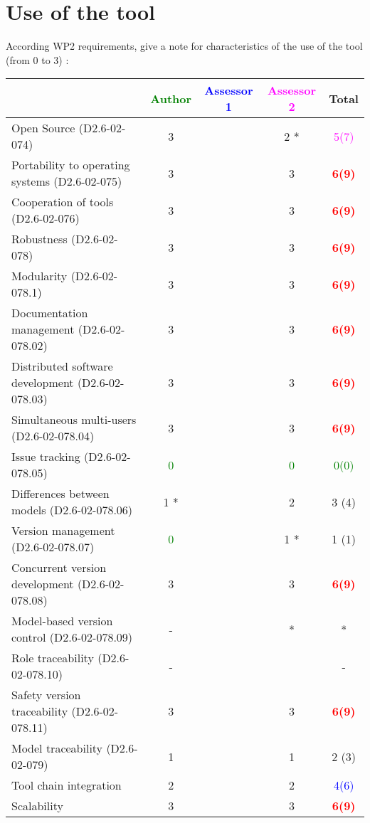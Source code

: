 \section{Use of the tool}


According WP2 requirements, give a note for characteristics of the use of the tool (from 0 to 3) :

\begin{tabular}{|l | c | c | c | c|}
\hline
& \textcolor{green}{Author} & \textcolor{blue}{Assessor 1} & \textcolor{magenta}{Assessor 2} & Total \\
\hline 
Open Source (D2.6-02-074) & 3     & & 2    *& \textcolor{magenta}{5(7)}  \\
\hline 
Portability to operating systems (D2.6-02-075) & 3     & & 3     &  \textcolor{red}{\textbf{6(9)}} \\
\hline
Cooperation of tools (D2.6-02-076) & 3     & & 3     &  \textcolor{red}{\textbf{6(9)}} \\
\hline
Robustness (D2.6-02-078) & 3     & & 3     &  \textcolor{red}{\textbf{6(9)}} \\
\hline
Modularity (D2.6-02-078.1) & 3     & & 3     &  \textcolor{red}{\textbf{6(9)}} \\
\hline
Documentation management (D2.6-02-078.02) & 3     & & 3     &  \textcolor{red}{\textbf{6(9)}} \\
\hline
Distributed software development (D2.6-02-078.03)  & 3     & & 3     &  \textcolor{red}{\textbf{6(9)}} \\
\hline
Simultaneous multi-users (D2.6-02-078.04)   & 3     & & 3     &  \textcolor{red}{\textbf{6(9)}} \\
\hline
Issue tracking (D2.6-02-078.05) & \textcolor{green}{0} & & \textcolor{green}{0} & \textcolor{green}{0(0)}  \\
\hline
Differences between models (D2.6-02-078.06) & 1    * & & 2     & 3 (4) \\
\hline
Version management (D2.6-02-078.07) & \textcolor{green}{0} & & 1    * & 1 (1) \\
\hline
Concurrent version development (D2.6-02-078.08) & 3     & & 3     &  \textcolor{red}{\textbf{6(9)}} \\
\hline
Model-based version control (D2.6-02-078.09) & - & & * & * \\
\hline
Role traceability (D2.6-02-078.10) & - & & & - \\
\hline
Safety version traceability (D2.6-02-078.11) & 3     & & 3     &  \textcolor{red}{\textbf{6(9)}} \\
\hline
Model traceability (D2.6-02-079) & 1     & & 1     & 2 (3) \\
\hline
Tool chain integration & 2     & & 2     & \textcolor{blue}{4(6)}  \\
\hline
Scalability & 3     & & 3     &  \textcolor{red}{\textbf{6(9)}} \\
\hline
\end{tabular}

